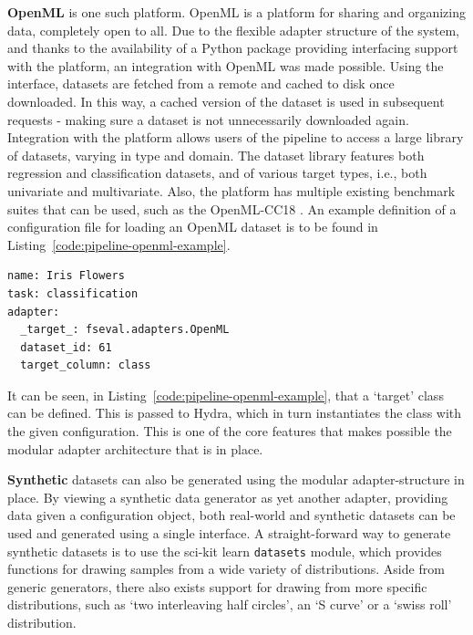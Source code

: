 \documentclass[../main.tex]{subfiles}
\begin{document}
\textbf{OpenML} is one such platform. OpenML \citep{vanschoren_openml_2014} is a platform for sharing and organizing data, completely open to all. Due to the flexible adapter structure of the system, and thanks to the availability of a Python package providing interfacing support with the platform, an integration with OpenML was made possible. Using the interface, datasets are fetched from a remote and cached to disk once downloaded. In this way, a cached version of the dataset is used in subsequent requests - making sure a dataset is not unnecessarily downloaded again. Integration with the platform allows users of the pipeline to access a large library of datasets, varying in type and domain. The dataset library features both regression and classification datasets, and of various target types, i.e., both univariate and multivariate. Also, the platform has multiple existing benchmark suites that can be used, such as the OpenML-CC18 \citep{bischl_openml_2019}. An example definition of a configuration file for loading an OpenML dataset is to be found in Listing~\ref{code:pipeline-openml-example}.

\begin{lstlisting}[caption={A dataset config for loading the `Iris Flowers' dataset from OpenML.}, label={code:pipeline-openml-example}]
name: Iris Flowers
task: classification
adapter:
  _target_: fseval.adapters.OpenML
  dataset_id: 61
  target_column: class
\end{lstlisting}

It can be seen, in Listing~\ref{code:pipeline-openml-example}, that a `target' class can be defined. This is passed to Hydra, which in turn instantiates the class with the given configuration. This is one of the core features that makes possible the modular adapter architecture that is in place.

\textbf{Synthetic} datasets can also be generated using the modular adapter-structure in place. By viewing a synthetic data generator as yet another adapter, providing data given a configuration object, both real-world and synthetic datasets can be used and generated using a single interface. A straight-forward way to generate synthetic datasets is to use the sci-kit learn \texttt{datasets} module, which provides functions for drawing samples from a wide variety of distributions. Aside from generic generators, there also exists support for drawing from more specific distributions, such as `two interleaving half circles', an `S curve' or a `swiss roll' distribution.
\end{document}
